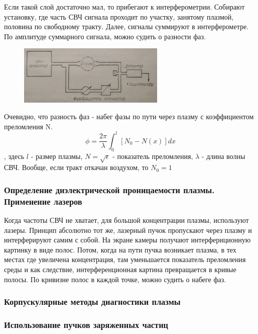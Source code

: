 \documentclass[10pt, a4paper]{article}
\begin{document}
Если такой слой достаточно мал, то прибегают к интерферометрии. Собирают установку, где часть СВЧ сигнала проходит по участку, занятому плазмой, половина по свободному тракту. Далее, сигналы суммируют в интерферометре. По амплитуде суммарного сигнала, можно судить о разности фаз.

\begin{figure}[ht]
	\begin{center}
		\includegraphics[width=70mm]{HF interferometre.JPG}
	\end{center}
\end{figure}

 Очевидно, что разность фаз - набег фазы по пути через плазму с коэффициентом преломления N.
 \begin{equation}
 	\phi = \frac{2 \pi}{\lambda} \int_{0}^{l} [N_0 - N(x)] dx 
 \end{equation} 
, здесь $l$ - размер плазмы, $N=\sqrt{\epsilon}$ - показатель преломления, $\lambda$ - длина волны СВЧ. Вообще, если тракт откачан воздухом, то $N_0 =1$


\subsubsection{Определение диэлектрической проницаемости плазмы. Применение лазеров}

Когда частоты СВЧ не хватает, для большой концентрации плазмы, используют лазеры.
Принцип абсолютно тот же, лазерный пучок пропускают через плазму и интерферируют самим с собой. На экране камеры получают интерфериционную картинку в виде полос. Потом, когда на пути пучка возникает плазма, в тех местах где увеличена концентрация, там уменьшается показатель преломления среды и как следствие, интерференционная картина превращается в кривые полосы. По кривизне полос в каждой точке, можно судить о набеге фаз.

\subsubsection{Корпускулярные методы диагностики плазмы}

\subsubsection{Использование пучков заряженных частиц}
\end{document}
